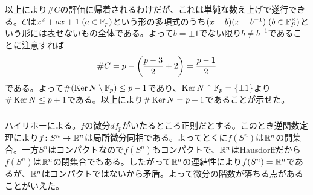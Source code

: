 \begin{sol}
\begin{description}
    以上により$\# C$の評価に帰着されるわけだが、これは単純な数え上げで遂行できる。$C$は$x^2 + ax + 1 \; ( a \in {\mathbb F}_p)$という形の多項式のうち$(x - b)(x - b^{-1}) \; ( b \in {\mathbb F}_P^{\times})$という形には表せないもの全体である。よって$b= \pm 1$でない限り$b \neq b^{-1}$であることに注意すれば
    \[
    \# C = p - \left( \frac{p-3}{2} + 2 \right) = \frac{p-1}{2}
    \]
    である。よって$\# ( \operatorname{Ker} N \setminus {\mathbb F}_p) \leq p-1$であり、$\operatorname{Ker} N \cap {\mathbb F}_p = \{ \pm 1 \}$より$\# \operatorname{Ker} N \leq p+1$である。以上により$\# \operatorname{Ker} N = p+1$であることが示せた。
  \end{description}
\end{sol}

\newpage


\subsubsection{}%
\begin{sol}
  ハイリホーによる。$f$の微分$df_p$がいたるところ正則だとする。このとき逆関数定理により$f \colon S^n \to {\mathbb R}^n$は局所微分同相である。よってとくに$f(S^n)$は${\mathbb R}^n$の開集合。一方$S^n$はコンパクトなので$f(S^n)$もコンパクトで、${\mathbb R}^n$はHausdorffだから$f(S^n)$は${\mathbb R}^n$の閉集合でもある。したがって${\mathbb R}^n$の連結性により$f(S^n) = {\mathbb R}^n$であるが、${\mathbb R}^n$はコンパクトではないから矛盾。よって微分の階数が落ちる点があることがいえた。
\end{sol}

\newpage

